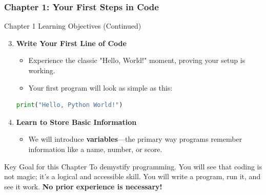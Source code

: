 \documentclass{beamer}
\begin{document}
\begin{frame}[fragile]
    \frametitle{Chapter 1: Your First Steps in Code}

    \begin{block}{Chapter 1 Learning Objectives (Continued)}
        \begin{enumerate}
            \setcounter{enumi}{2} %
            \item \textbf{Write Your First Line of Code}
            \begin{itemize}
                \item Experience the classic "Hello, World!" moment, proving your setup is working.
                \item Your first program will look as simple as this:
            \end{itemize}
            \begin{lstlisting}[language=Python]
print("Hello, Python World!")
            \end{lstlisting}
            \item \textbf{Learn to Store Basic Information}
            \begin{itemize}
                \item We will introduce \textbf{variables}---the primary way programs remember information like a name, number, or score.
            \end{itemize}
        \end{enumerate}
    \end{block}

    \begin{alertblock}{Key Goal for this Chapter}
        To demystify programming. You will see that coding is not magic; it's a logical and accessible skill. You will write a program, run it, and see it work. \textbf{No prior experience is necessary!}
    \end{alertblock}
\end{frame}
\end{document}
